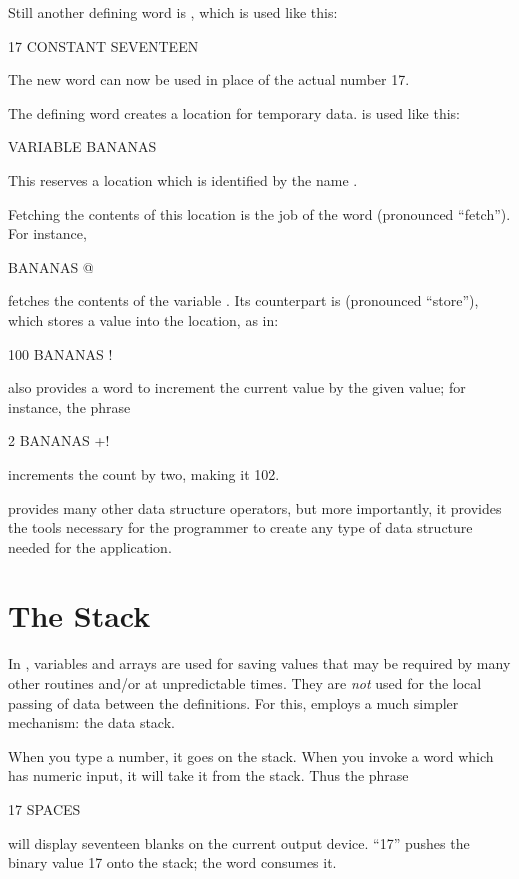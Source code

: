 Still another defining word is , which
is used like this:
\begin{Code}
17 CONSTANT SEVENTEEN
\end{Code}
The new word  can now be used in place of the actual
number 17.

{\sloppy
The defining word  creates a location
for temporary data.  is used like this:
\begin{Code}
VARIABLE BANANAS
\end{Code}
This reserves a location which is identified by the name .}

Fetching the contents of this location is the job of the word 
(pronounced ``fetch'').  For instance,
\begin{Code}
BANANAS @
\end{Code}
fetches the contents of the variable .  Its counterpart is
\forthb{!} (pronounced ``store''), which stores a value into the location,
as in:
\begin{Code}
100 BANANAS !
\end{Code}
\Forth{} also provides a word to increment the current value by the given
value; for instance, the phrase
\begin{Code}
2 BANANAS +!
\end{Code}
increments the count by two, making it 102.

\Forth{} provides many other
data structure operators, but more
importantly, it provides the tools necessary for the programmer to
create any type of data structure needed for the application.%
%

\section{The Stack}
In \Forth{}, variables and arrays are used for saving values that may be
required by many other routines and/or at unpredictable times.  They are
\emph{not} used for the local passing of data between the definitions.
For this, \Forth{} employs a much simpler mechanism: the data stack.

When you type a number, it goes on the stack.  When you invoke a word
which has numeric input, it will take it from the stack.  Thus the phrase
\begin{Code}
17 SPACES
\end{Code}
will display seventeen blanks on the current output device.  ``17'' pushes
the binary value 17 onto the stack; the word  consumes it.

